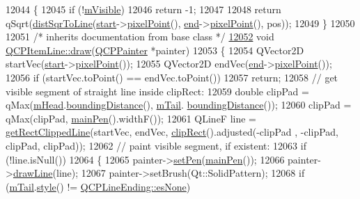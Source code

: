 \begin{DoxyCode}
12044 \textcolor{keyword}{}\{
12045   \textcolor{keywordflow}{if} (!\hyperlink{a00044_a62e3aed8427d6ce3ccf716f285106cb3}{mVisible})
12046     \textcolor{keywordflow}{return} -1;
12047   
12048   \textcolor{keywordflow}{return} qSqrt(\hyperlink{a00022_acdca343717d625b8abb3c3e38c0ed39d}{distSqrToLine}(\hyperlink{a00036_a602da607a09498b0f152ada1d6851bc5}{start}->\hyperlink{a00038_ae490f9c76ee2ba33752c495d3b6e8fb5}{pixelPoint}(), 
      \hyperlink{a00036_a15598864c1c22a2497a1979c4980c4e1}{end}->\hyperlink{a00038_ae490f9c76ee2ba33752c495d3b6e8fb5}{pixelPoint}(), pos));
12049 \}
12050 
12051 \textcolor{comment}{/* inherits documentation from base class */}
\hypertarget{a00115_source_l12052}{}\hyperlink{a00036_a1fc045dd33919f8006df0692aeb0e84a}{12052} \textcolor{keywordtype}{void} \hyperlink{a00036_a1fc045dd33919f8006df0692aeb0e84a}{QCPItemLine::draw}(\hyperlink{a00047}{QCPPainter} *painter)
12053 \{
12054   QVector2D startVec(\hyperlink{a00036_a602da607a09498b0f152ada1d6851bc5}{start}->\hyperlink{a00038_ae490f9c76ee2ba33752c495d3b6e8fb5}{pixelPoint}());
12055   QVector2D endVec(\hyperlink{a00036_a15598864c1c22a2497a1979c4980c4e1}{end}->\hyperlink{a00038_ae490f9c76ee2ba33752c495d3b6e8fb5}{pixelPoint}());
12056   \textcolor{keywordflow}{if} (startVec.toPoint() == endVec.toPoint())
12057     \textcolor{keywordflow}{return};
12058   \textcolor{comment}{// get visible segment of straight line inside clipRect:}
12059   \textcolor{keywordtype}{double} clipPad = qMax(\hyperlink{a00036_a51603f28ab7ddb1c1a95ea384791d3ed}{mHead}.\hyperlink{a00046_a586b45cf738881a70119e353dc1ed59c}{boundingDistance}(), \hyperlink{a00036_ab8ed61dfe15bbb1cbf9b95eae95e242f}{mTail}.
      \hyperlink{a00046_a586b45cf738881a70119e353dc1ed59c}{boundingDistance}());
12060   clipPad = qMax(clipPad, \hyperlink{a00036_a7b5bc4ebacb55774b87c91b308ca7912}{mainPen}().widthF());
12061   QLineF line = \hyperlink{a00036_a36e8620019a221ccea4357f0287b81c2}{getRectClippedLine}(startVec, endVec, \hyperlink{a00022_a538e25ff8856534582f5b2b400a46405}{clipRect}().adjusted(-clipPad
      , -clipPad, clipPad, clipPad));
12062   \textcolor{comment}{// paint visible segment, if existent:}
12063   \textcolor{keywordflow}{if} (!line.isNull())
12064   \{
12065     painter->\hyperlink{a00047_af9c7a4cd1791403901f8c5b82a150195}{setPen}(\hyperlink{a00036_a7b5bc4ebacb55774b87c91b308ca7912}{mainPen}());
12066     painter->\hyperlink{a00047_a0b4b1b9bd495e182c731774dc800e6e0}{drawLine}(line);
12067     painter->setBrush(Qt::SolidPattern);
12068     \textcolor{keywordflow}{if} (\hyperlink{a00036_ab8ed61dfe15bbb1cbf9b95eae95e242f}{mTail}.\hyperlink{a00046_aea324dbfddbca9895ca8a3a968671299}{style}() != \hyperlink{a00046_a5ef16e6876b4b74959c7261d8d4c2cd5aca12d500f50cd6871766801bac30fb03}{QCPLineEnding::esNone})

\end{DoxyCode}

